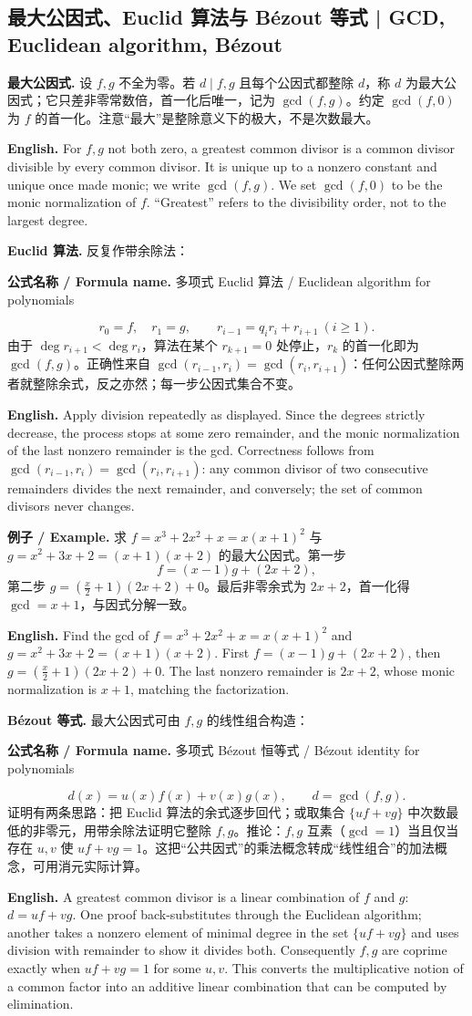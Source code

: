 \documentclass[UTF8,11pt,a4paper]{ctexart}
\newcommand{\EN}[1]{\par\noindent\textbf{English.} #1\par}
\newcommand{\FORMULA}[2]{\par\noindent\textbf{公式名称 / Formula name.} #1 / #2\par}
\newcommand{\EX}[2]{\par\noindent\textbf{例子 / Example.} #1\par\EN{#2}}
\begin{document}
\subsection{最大公因式、Euclid 算法与 Bézout 等式 | GCD, Euclidean algorithm, Bézout}
\noindent\textbf{最大公因式.} 设 $f,g$ 不全为零。若 $d\mid f,g$ 且每个公因式都整除 $d$，称 $d$ 为最大公因式；它只差非零常数倍，首一化后唯一，记为 $\gcd(f,g)$。约定 $\gcd(f,0)$ 为 $f$ 的首一化。注意“最大”是整除意义下的极大，不是次数最大。
\EN{For $f,g$ not both zero, a greatest common divisor is a common divisor divisible by every common divisor. It is unique up to a nonzero constant and unique once made monic; we write $\gcd(f,g)$. We set $\gcd(f,0)$ to be the monic normalization of $f$. ``Greatest'' refers to the divisibility order, not to the largest degree.}
\noindent\textbf{Euclid 算法.} 反复作带余除法：
\FORMULA{多项式 Euclid 算法}{Euclidean algorithm for polynomials}
\[
r_0=f,\quad r_1=g,\qquad r_{i-1}=q_ir_i+r_{i+1}\ (i\ge1).
\]
由于 $\deg r_{i+1}<\deg r_i$，算法在某个 $r_{k+1}=0$ 处停止，$r_k$ 的首一化即为 $\gcd(f,g)$。正确性来自 $\gcd(r_{i-1},r_i)=\gcd(r_i,r_{i+1})$：任何公因式整除两者就整除余式，反之亦然；每一步公因式集合不变。
\EN{Apply division repeatedly as displayed. Since the degrees strictly decrease, the process stops at some zero remainder, and the monic normalization of the last nonzero remainder is the gcd. Correctness follows from $\gcd(r_{i-1},r_i)=\gcd(r_i,r_{i+1})$: any common divisor of two consecutive remainders divides the next remainder, and conversely; the set of common divisors never changes.}
\EX{求 $f=x^3+2x^2+x=x(x+1)^2$ 与 $g=x^2+3x+2=(x+1)(x+2)$ 的最大公因式。第一步
\[
f=(x-1)g+(2x+2),
\]
第二步 $g=(\tfrac{x}{2}+1)(2x+2)+0$。最后非零余式为 $2x+2$，首一化得 $\gcd=x+1$，与因式分解一致。}{Find the gcd of $f=x^3+2x^2+x=x(x+1)^2$ and $g=x^2+3x+2=(x+1)(x+2)$. First $f=(x-1)g+(2x+2)$, then $g=(\tfrac{x}{2}+1)(2x+2)+0$. The last nonzero remainder is $2x+2$, whose monic normalization is $x+1$, matching the factorization.}
\noindent\textbf{Bézout 等式.} 最大公因式可由 $f,g$ 的线性组合构造：
\FORMULA{多项式 Bézout 恒等式}{Bézout identity for polynomials}
\[
d(x)=u(x)f(x)+v(x)g(x),\qquad d=\gcd(f,g).
\]
证明有两条思路：把 Euclid 算法的余式逐步回代；或取集合 $\{uf+vg\}$ 中次数最低的非零元，用带余除法证明它整除 $f,g$。推论：$f,g$ 互素（$\gcd=1$）当且仅当存在 $u,v$ 使 $uf+vg=1$。这把“公共因式”的乘法概念转成“线性组合”的加法概念，可用消元实际计算。
\EN{A greatest common divisor is a linear combination of $f$ and $g$: $d=uf+vg$. One proof back-substitutes through the Euclidean algorithm; another takes a nonzero element of minimal degree in the set $\{uf+vg\}$ and uses division with remainder to show it divides both. Consequently $f,g$ are coprime exactly when $uf+vg=1$ for some $u,v$. This converts the multiplicative notion of a common factor into an additive linear combination that can be computed by elimination.}
\end{document}
